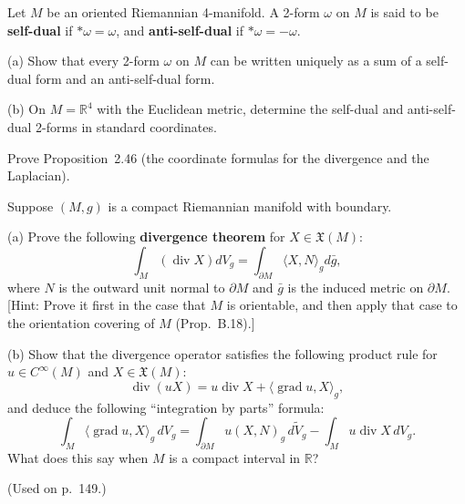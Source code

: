 \begin{exercise}\label{prob:self-dual-anti-self-dual}
Let $M$ be an oriented Riemannian 4-manifold. A 2-form $\omega$ on $M$ is said to be \textbf{self-dual} if $*\omega = \omega$, and \textbf{anti-self-dual} if $*\omega = -\omega$.

(a) Show that every 2-form $\omega$ on $M$ can be written uniquely as a sum of a self-dual form and an anti-self-dual form.

(b) On $M = \mathbb{R}^4$ with the Euclidean metric, determine the self-dual and anti-self-dual 2-forms in standard coordinates.
\end{exercise}

\begin{exercise}\label{prob:divergence-laplacian-formulas-ch2}
Prove Proposition~2.46 (the coordinate formulas for the divergence and the Laplacian).
\end{exercise}

\begin{exercise}\label{prob:divergence-theorem}
Suppose $(M,g)$ is a compact Riemannian manifold with boundary.

(a) Prove the following \textbf{divergence theorem} for $X \in \mathfrak{X}(M)$:
\[
\int_M (\operatorname{div} X) dV_g = \int_{\partial M} \langle X, N\rangle_g d\bar{g},
\]
where $N$ is the outward unit normal to $\partial M$ and $\bar{g}$ is the induced metric on $\partial M$. [Hint: Prove it first in the case that $M$ is orientable, and then apply that case to the orientation covering of $M$ (Prop.~B.18).]

(b) Show that the divergence operator satisfies the following product rule for
$u \in C^\infty(M)$ and $X \in \mathfrak{X}(M)$:
\[
\operatorname{div}(uX) = u \operatorname{div} X + \langle \operatorname{grad} u, X \rangle_g,
\]
and deduce the following ``integration by parts'' formula:
\[
\int_M \langle \operatorname{grad} u, X \rangle_g \, dV_g = \int_{\partial M} u(X,N)_g \, d\tilde{V}_g - \int_M u \operatorname{div} X \, dV_g.
\]
What does this say when $M$ is a compact interval in $\mathbb{R}$?

(Used on p.\ 149.)
\end{exercise}

